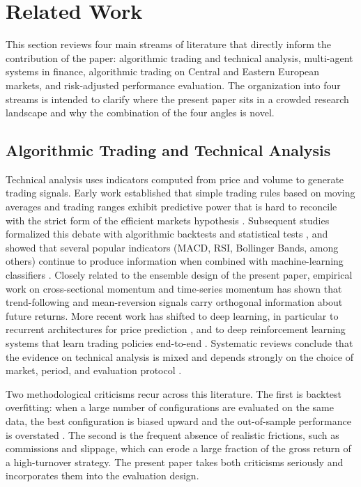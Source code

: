 \documentclass{ieeeaccess}
\begin{document}
\section{Related Work}
\label{sec:related_work}

This section reviews four main streams of literature that directly inform the contribution of the paper: algorithmic trading and technical analysis, multi-agent systems in finance, algorithmic trading on Central and Eastern European markets, and risk-adjusted performance evaluation. The organization into four streams is intended to clarify where the present paper sits in a crowded research landscape and why the combination of the four angles is novel.

\subsection{Algorithmic Trading and Technical Analysis}

Technical analysis uses indicators computed from price and volume to generate trading signals. Early work established that simple trading rules based on moving averages and trading ranges exhibit predictive power that is hard to reconcile with the strict form of the efficient markets hypothesis \cite{brock1992}. Subsequent studies formalized this debate with algorithmic backtests and statistical tests \cite{boboc2013}, and showed that several popular indicators (MACD, RSI, Bollinger Bands, among others) continue to produce information when combined with machine-learning classifiers \cite{gerlein2016}. Closely related to the ensemble design of the present paper, empirical work on cross-sectional momentum \cite{jegadeeshtitman1993,asness2013} and time-series momentum \cite{moskowitz2012} has shown that trend-following and mean-reversion signals carry orthogonal information about future returns. More recent work has shifted to deep learning, in particular to recurrent architectures for price prediction \cite{fischerkrauss2018}, and to deep reinforcement learning systems that learn trading policies end-to-end \cite{huang2022,shavandi2022,kaursingh2023}. Systematic reviews conclude that the evidence on technical analysis is mixed and depends strongly on the choice of market, period, and evaluation protocol \cite{nti2020}.

Two methodological criticisms recur across this literature. The first is backtest overfitting: when a large number of configurations are evaluated on the same data, the best configuration is biased upward and the out-of-sample performance is overstated \cite{bailey2014,harvey2016}. The second is the frequent absence of realistic frictions, such as commissions and slippage, which can erode a large fraction of the gross return of a high-turnover strategy. The present paper takes both criticisms seriously and incorporates them into the evaluation design.
\end{document}
